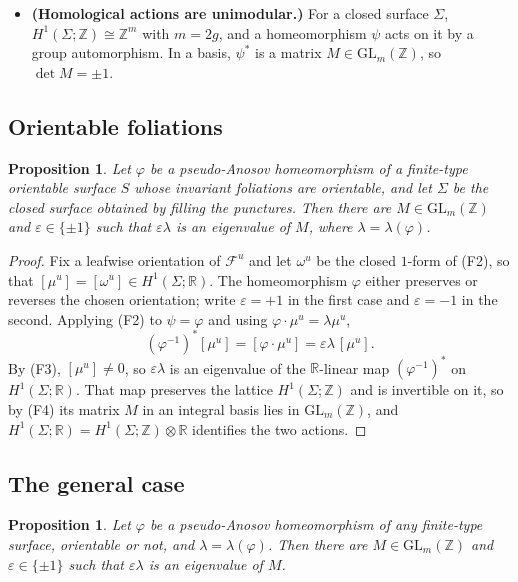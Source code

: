 \documentclass[11pt]{article}
\theoremstyle{plain}
\newtheorem{proposition}[theorem]{Proposition}
\theoremstyle{definition}
\theoremstyle{remark}
\newcommand{\Fu}{\mathcal{F}^{u}}
\newcommand{\HH}{H^{1}}
\newcommand{\ZZ}{\mathbb{Z}}
\newcommand{\RR}{\mathbb{R}}
\begin{document}
\begin{itemize}
\item[(F4)] \textbf{(Homological actions are unimodular.)} For a closed surface
$\Sigma$, $\HH(\Sigma;\ZZ)\cong\ZZ^{m}$ with $m=2g$, and a homeomorphism $\psi$
acts on it by a group automorphism. In a basis, $\psi^{*}$ is a matrix
$M\in\mathrm{GL}_{m}(\ZZ)$, so $\det M=\pm1$.
\end{itemize}

\subsection{Orientable foliations}

\begin{proposition}\label{prop:orientable}
Let $\varphi$ be a pseudo-Anosov homeomorphism of a finite-type orientable surface
$S$ whose invariant foliations are orientable, and let $\Sigma$ be the closed
surface obtained by filling the punctures. Then there are $M\in
\mathrm{GL}_{m}(\ZZ)$ and $\varepsilon\in\{\pm1\}$ such that $\varepsilon\lambda$
is an eigenvalue of $M$, where $\lambda=\lambda(\varphi)$.
\end{proposition}

\begin{proof}
Fix a leafwise orientation of $\Fu$ and let $\omega^{u}$ be the closed $1$-form of
(F2), so that $[\mu^{u}]=[\omega^{u}]\in\HH(\Sigma;\RR)$. The homeomorphism
$\varphi$ either preserves or reverses the chosen orientation; write
$\varepsilon=+1$ in the first case and $\varepsilon=-1$ in the second. Applying
(F2) to $\psi=\varphi$ and using $\varphi\cdot\mu^{u}=\lambda\mu^{u}$,
\[
  (\varphi^{-1})^{*}[\mu^{u}]
  =[\varphi\cdot\mu^{u}]
  =\varepsilon\lambda\,[\mu^{u}] .
\]
By (F3), $[\mu^{u}]\ne0$, so $\varepsilon\lambda$ is an eigenvalue of the
$\RR$-linear map $(\varphi^{-1})^{*}$ on $\HH(\Sigma;\RR)$. That map preserves the
lattice $\HH(\Sigma;\ZZ)$ and is invertible on it, so by (F4) its matrix $M$ in an
integral basis lies in $\mathrm{GL}_{m}(\ZZ)$, and
$\HH(\Sigma;\RR)=\HH(\Sigma;\ZZ)\otimes\RR$ identifies the two actions.
\end{proof}

\subsection{The general case}\label{sec:general}

\begin{proposition}\label{prop:general}
Let $\varphi$ be a pseudo-Anosov homeomorphism of any finite-type surface,
orientable or not, and $\lambda=\lambda(\varphi)$. Then there are
$M\in\mathrm{GL}_{m}(\ZZ)$ and $\varepsilon\in\{\pm1\}$ such that
$\varepsilon\lambda$ is an eigenvalue of $M$.
\end{proposition}
\end{document}
